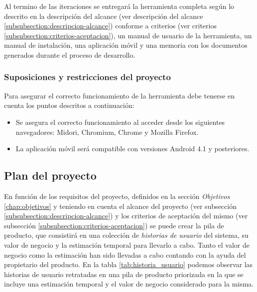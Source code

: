 	Al termino de las iteraciones se entregará la herramienta completa según lo descrito en la descripción del alcance (ver descripción del alcance \ref{subsubsection:descripcion-alcance}) conforme a criterios (ver criterios \ref{subsubsection:criterios-aceptacion}), un manual de usuario de la herramienta, un manual de instalación, una aplicación móvil y una memoria con los documentos generados durante el proceso de desarrollo.
	
		\subsubsection{Suposiciones y restricciones del proyecto}
		Para asegurar el correcto funcionamiento de la herramienta debe tenerse en cuenta los puntos descritos a continuación:
		
		\begin{itemize}[label={$\bullet$},labelindent=\parindent,leftmargin=2cm]
			\item Se asegura el correcto funcionamiento al acceder desde los siguientes navegadores: Midori, Chromium, Chrome y Mozilla Firefox.
			\item La aplicación móvil será compatible con versiones Android 4.1 y posteriores.
		\end{itemize}

	\subsection{Plan del proyecto}
	En función de los requisitos del proyecto, definidos en la sección \textit{Objetivos} \ref{chap:objetivos} y teniendo en cuenta el alcance del proyecto (ver subsección \ref{subsubsection:descripcion-alcance}) y los criterios de aceptación del mismo (ver subsección \ref{subsubsection:criterios-aceptacion}) se puede crear la pila de producto, que consistirá en una colección de \textit{historias de usuario} del sistema, su valor de negocio y la estimación temporal para llevarlo a cabo. Tanto el valor de negocio como la estimación han sido llevadas a cabo contando con la ayuda del propietario del producto.
	En la tabla \ref{tab:historia_usuario} podemos observar las historias de usuario retratadas en una pila de producto priorizada en la que se incluye una estimación temporal y el valor de negocio considerado para la misma.


